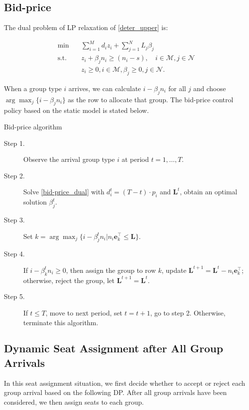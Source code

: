 \subsection{Bid-price}

The dual problem of LP relaxation of \eqref{deter_upper} is:

\begin{equation}\label{bid-price_dual}
  \begin{aligned}
  \min \quad & \sum_{i=1}^{M} d_i z_i + \sum_{j= 1}^{N} L_j \beta_{j} \\
  \text {s.t.} \quad & z_{i} + \beta_j n_i \geq (n_i-s), \quad i \in \mathcal{M}, j \in \mathcal{N} \\
  & z_{i} \geq 0, i \in \mathcal{M}, \beta_{j} \geq 0, j \in \mathcal{N}.
  \end{aligned}
\end{equation}

When a group type $i$ arrives, we can calculate $i -\beta_{j} n_i$ for all $j$ and choose $\arg \max_{j} \{i -\beta_{j} n_i\}$ as the row to allocate that group. The bid-price control policy based on the static model is stated below.

\begin{algorithm}[H]
  \caption{Bid-price algorithm}
  \begin{description}
    \item[Step 1.] Observe the arrival group type $i$ at period $t = 1, \ldots, T$.
    \item[Step 2.] Solve \eqref{bid-price_dual} with $d_i^{t} = (T-t) \cdot p_i$ and $\mathbf{L}^{t}$, obtain an optimal solution $\beta_{j}^{t}$.
    \item[Step 3.] Set $k = \arg \max_{j} \{i -\beta_{j}^{t} n_i | n_i \mathbf{e}_{k}^{\top} \leq \mathbf{L}\}$.
    \item[Step 4.] If $i -\beta_{k}^{t} n_i \geq 0$, then assign the group to row $k$, update $\mathbf{L}^{t+1} = \mathbf{L}^{t} - n_i \mathbf{e}_{k}^{\top}$; otherwise, reject the group, let $\mathbf{L}^{t+1} = \mathbf{L}^{t}$. 
    \item[Step 5.] If $t \leq T$, move to next period, set $t = t+1$, go to step 2. Otherwise, terminate this algorithm.
  \end{description}
\end{algorithm}

\subsection{Dynamic Seat Assignment after All Group Arrivals}
In this seat assignment situation, we first decide whether to accept or reject each group arrival based on the following DP. After all group arrivals have been considered, we then assign seats to each group.

